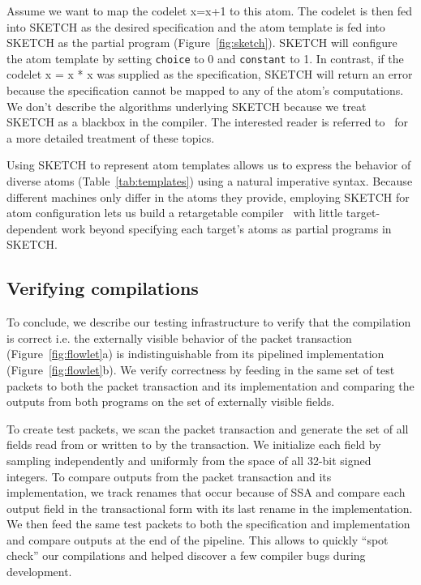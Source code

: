 Assume we want to map the codelet x=x+1 to this atom. The codelet is then fed
into SKETCH as the desired specification and the atom template is fed into
SKETCH as the partial program (Figure~\ref{fig:sketch}). SKETCH will configure
the atom template by setting \texttt{choice} to 0 and \texttt{constant} to 1.
In contrast, if the codelet x = x * x was supplied as the specification, SKETCH
will return an error because the specification cannot be mapped to any of the
atom's computations. We don't describe the algorithms underlying SKETCH because
we treat SKETCH as a blackbox in the \pktlanguage compiler. The interested
reader is referred to~\cite{bitstreaming, sketch_asplos} for a more detailed
treatment of these topics.

Using SKETCH to represent atom templates allows us to express the behavior of
diverse atoms (Table~\ref{tab:templates}) using a natural imperative syntax.
Because different \absmachine machines only differ in the atoms they provide,
employing SKETCH for atom configuration lets us build a retargetable
compiler~\cite{lcc} with little target-dependent work beyond specifying each
target's atoms as partial programs in SKETCH.

\subsection{Verifying compilations}
\label{ss:verification}

To conclude, we describe our testing infrastructure to verify that the
compilation is correct i.e. the externally visible behavior of the packet
transaction (Figure~\ref{fig:flowlet}a) is indistinguishable from its pipelined
implementation (Figure~\ref{fig:flowlet}b). We verify correctness by feeding in
the same set of test packets to both the packet transaction and its
implementation and comparing the outputs from both programs on the set of
externally visible fields.

To create test packets, we scan the packet transaction and generate the set of
all fields read from or written to by the transaction. We initialize each field
by sampling independently and uniformly from the space of all 32-bit signed
integers.  To compare outputs from the packet transaction and its
implementation, we track renames that occur because of SSA and compare each
output field in the transactional form with its last rename in the
implementation. We then feed the same test packets to both the specification
and implementation and compare outputs at the end of the pipeline. This allows
to quickly ``spot check'' our compilations and helped discover a few compiler
bugs during development.
